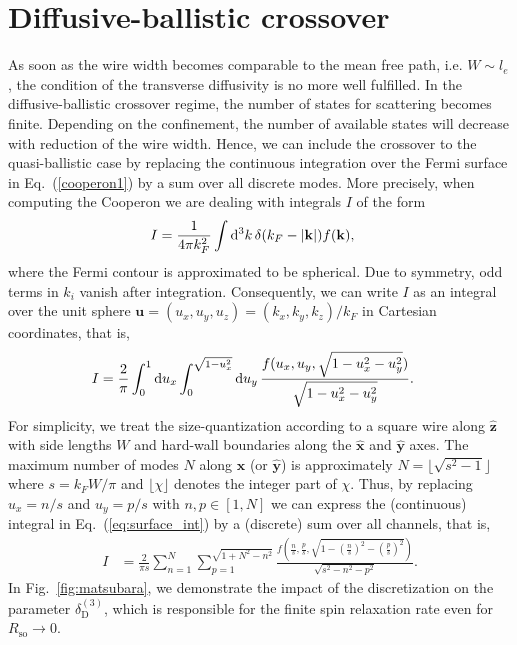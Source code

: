 \documentclass[superscriptaddress,noshowpacs,noshowkeys, twocolumn, floatfix,aps, prb,reprint]{revtex4-1}
\begin{document}
\section{Diffusive-ballistic crossover}\label{app:Crossover}
%
As soon as the wire width becomes comparable to the mean free path, i.e. $W\sim l_e$, the condition of the transverse diffusivity is no more well fulfilled.
In the diffusive-ballistic crossover regime, the number of states for scattering becomes finite. 
Depending on the confinement, the number of available states will decrease with reduction of the wire width. 
Hence, we can include the crossover to the quasi-ballistic case by replacing the continuous integration over the Fermi surface in Eq.~(\ref{cooperon1}) by a sum over all discrete modes.\cite{Wenk2011} 
More precisely, when computing the Cooperon we are dealing with integrals $I$ of the form
%
\begin{align}
I{}&=\frac{1}{4\pi k_F^2}\int {\rm d}^3 k\, \delta(k_F-\vert\mathbf{k}\vert)f(\mathbf{k}),
\end{align}
%
where the Fermi contour is approximated to be spherical.
Due to symmetry, odd terms in $k_i$ vanish after integration.
Consequently, we can write $I$ as an integral over the unit sphere $\mathbf{u}=(u_x,u_y,u_z)=(k_x,k_y,k_z)/k_F$ in Cartesian coordinates, that is,
%
\begin{align}
I{}&=\frac{2}{\pi}\int_0^1 {\rm d}u_x \int_0^{\sqrt{1-u_x^2}}{\rm d}u_y\, \frac{f(u_x,u_y,\sqrt{1-u_x^2-u_y^2})}{\sqrt{1-u_x^2-u_y^2}}.\label{eq:surface_int}
\end{align}
%
For simplicity, we treat the size-quantization according to a square wire along $\mathbf{\hat{z}}$ with side lengths $W$ and hard-wall boundaries along the $\mathbf{\hat{x}}$ and $\mathbf{\hat{y}}$ axes.
The maximum number of modes $N$ along  $\mathbf{\hat{x}}$ (or $\mathbf{\hat{y}}$) is approximately $N=\lfloor \sqrt{s^2-1}\rfloor$ where $s=k_F W/\pi$ and $\lfloor \chi\rfloor$ denotes the integer part of $\chi$.
Thus, by replacing $u_x=n/s$ and $u_y=p/s$ with $n,p \in [1,N]$ we can express the (continuous) integral in Eq.~(\ref{eq:surface_int}) by a (discrete) sum over all channels, that is,
%
\begin{align}
I{}&=\frac{2}{\pi s}\sum_{n=1}^N\sum_{p=1}^{\sqrt{1+N^2-n^2}}\frac{f(\frac{n}{s},\frac{p}{s},\sqrt{1-\left(\frac{n}{s}\right)^2-\left(\frac{p}{s}\right)^2})}{\sqrt{s^2-n^2-p^2}}.
\end{align}
%
In Fig.~\ref{fig:matsubara}, we demonstrate the impact of the discretization on the parameter $\delta_\text{D}^{(3)}$, which is responsible for the finite spin relaxation rate even for $R_\text{so}\rightarrow0$.





\end{document}
